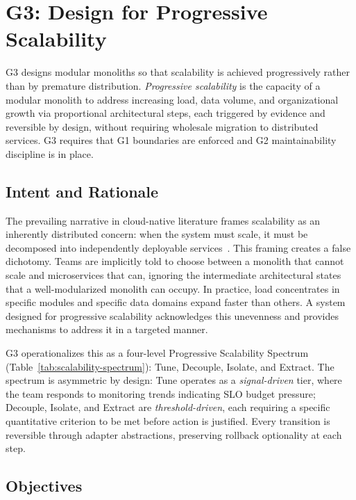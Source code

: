 \pagebreak
\section{G3: Design for Progressive Scalability}
\label{sec:g3-design-progressive-scalability}

G3 designs modular monoliths so that scalability is achieved progressively rather than by premature distribution. \emph{Progressive scalability} is the capacity of a modular monolith to address increasing load, data volume, and organizational growth via proportional architectural steps, each triggered by evidence and reversible by design, without requiring wholesale migration to distributed services. G3 requires that G1 boundaries are enforced and G2 maintainability discipline is in place.

\subsection*{Intent and Rationale}

The prevailing narrative in cloud-native literature frames scalability as an inherently distributed concern: when the system must scale, it must be decomposed into independently deployable services~\cite{arya2024beyond, blinowski2022monolithic}. This framing creates a false dichotomy. Teams are implicitly told to choose between a monolith that cannot scale and microservices that can, ignoring the intermediate architectural states that a well-modularized monolith can occupy. In practice, load concentrates in specific modules and specific data domains expand faster than others. A system designed for progressive scalability acknowledges this unevenness and provides mechanisms to address it in a targeted manner.

G3 operationalizes this as a four-level Progressive Scalability Spectrum (Table~\ref{tab:scalability-spectrum}): Tune, Decouple, Isolate, and Extract. The spectrum is asymmetric by design: Tune operates as a \emph{signal-driven} tier, where the team responds to monitoring trends indicating SLO budget pressure; Decouple, Isolate, and Extract are \emph{threshold-driven}, each requiring a specific quantitative criterion to be met before action is justified. Every transition is reversible through adapter abstractions, preserving rollback optionality at each step.

\subsection*{Objectives}


